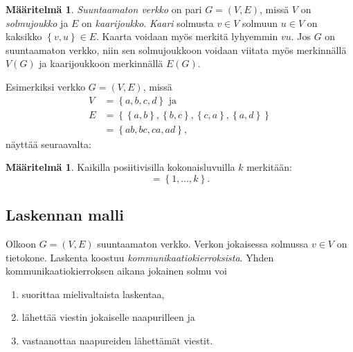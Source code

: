 \documentclass[finnish]{tktltiki2}
\theoremstyle{definition}
\newtheorem{maar}[lau]{Määritelmä}
\theoremstyle{remark}
\newcommand{\set}[1]{\left\{ #1 \right\}}
\begin{document}
\begin{maar}
    \emph{Suuntaamaton verkko} on pari $G = (V,E)$, missä $V$ on
    \emph{solmujoukko} ja $E$ on \emph{kaarijoukko}. \emph{Kaari} solmusta $v
    \in V$ solmuun $u \in V$ on kaksikko $\set{v,u} \in E$. Kaarta voidaan myös
    merkitä lyhyemmin $vu$. Jos $G$ on suuntaamaton verkko, niin sen
    solmujoukkoon voidaan viitata myös merkinnällä $V(G)$ ja kaarijoukkoon
    merkinnällä $E(G)$.
\end{maar}

Esimerkiksi verkko $G = (V,E)$, missä
%
\begin{align*}
    V &= \set{a,b,c,d} \text{ ja}\\
    E &= \set{ \set{a,b}, \set{b,c}, \set{c,a}, \set{a,d}} \\
      &= \set{ab, bc, ca, ad},
\end{align*}
%
näyttää seuraavalta:
%
\begin{center}
\end{center}

\begin{maar}
    Kaikilla posiitivisilla kokonaisluvuilla $k$ merkitään:
    \begin{equation*}
        [k] = \set{1, \dots, k}.
    \end{equation*}
\end{maar}

\subsection{Laskennan malli}

Olkoon $G = (V,E)$ suuntaamaton verkko. Verkon jokaisessa solmussa $v \in V$ on
tietokone. Laskenta koostuu \emph{kommunikaatiokierroksista}. Yhden
kommunikaatiokierroksen aikana jokainen solmu voi

\begin{enumerate}
    \item suorittaa mielivaltaista laskentaa,
    \item lähettää viestin jokaiselle naapurilleen ja
    \item vastaanottaa naapureiden lähettämät viestit.
\end{enumerate}
\end{document}

